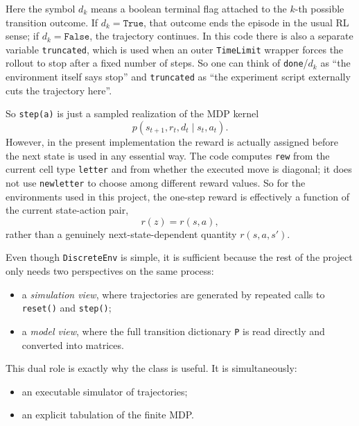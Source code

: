 \documentclass[11pt]{article}
\begin{document}
Here the symbol \(d_k\) means a boolean terminal flag attached to the \(k\)-th possible
transition outcome. If \(d_k=\texttt{True}\), that outcome ends the episode in the usual RL
sense; if \(d_k=\texttt{False}\), the trajectory continues. In this code there is also a
separate variable \texttt{truncated}, which is used when an outer \texttt{TimeLimit} wrapper
forces the rollout to stop after a fixed number of steps. So one can think of
\texttt{done}/\(d_k\) as ``the environment itself says stop'' and \texttt{truncated} as ``the
experiment script externally cuts the trajectory here''.

So \texttt{step(a)} is just a sampled realization of the MDP kernel
\begin{equation}
    p(s_{t+1},r_t,d_t \mid s_t,a_t).
\end{equation}
However, in the present implementation the reward is actually assigned before the next state is
used in any essential way. The code computes \texttt{rew} from the current cell type
\texttt{letter} and from whether the executed move is diagonal; it does not use
\texttt{newletter} to choose among different reward values. So for the environments used in
this project, the one-step reward is effectively a function of the current state-action pair,
\begin{equation}
    r(z)=r(s,a),
\end{equation}
rather than a genuinely next-state-dependent quantity \(r(s,a,s')\).

Even though \texttt{DiscreteEnv} is simple, it is sufficient because the rest of the project
only needs two perspectives on the same process:
\begin{itemize}
    \item a \emph{simulation view}, where trajectories are generated by repeated calls to
    \texttt{reset()} and \texttt{step()};
    \item a \emph{model view}, where the full transition dictionary \texttt{P} is read
    directly and converted into matrices.
\end{itemize}

This dual role is exactly why the class is useful. It is simultaneously:
\begin{itemize}
    \item an executable simulator of trajectories;
    \item an explicit tabulation of the finite MDP.
\end{itemize}
\end{document}
